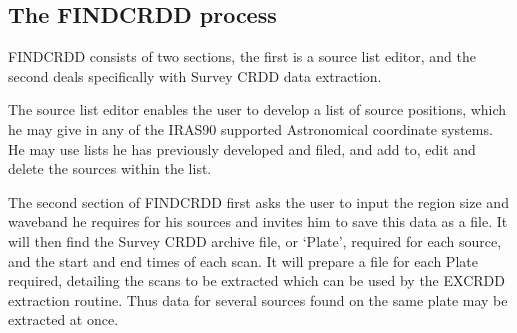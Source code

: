 \documentclass[twoside,11pt]{starlink}
\begin{document}
\subsection{The FINDCRDD process}
FINDCRDD consists of two sections, the first is a source list editor, and the
second deals specifically with Survey CRDD data extraction.

The source list editor enables the user to develop a list of source positions,
which he may give in any of the IRAS90 supported Astronomical coordinate
systems. He may use lists he has previously developed and filed, and add to,
edit and delete the sources within the list.

The second section of  FINDCRDD first asks the user to input the region size
and waveband he requires for his sources and invites him to save this data as a
file. It will then find the Survey CRDD archive file, or `Plate', required for
each source, and the start and end times of each scan. It will prepare a file
for each Plate required, detailing the scans to be extracted which can be used
by the EXCRDD extraction routine. Thus data for several sources found on the
same plate may be extracted at once.
\end{document}
